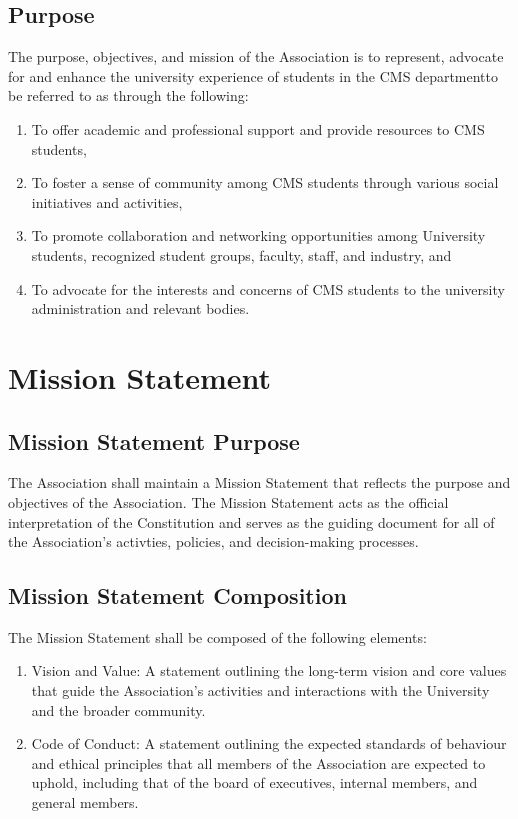 \subsection{Purpose}
The purpose, objectives, and mission of the Association is to 
represent, advocate for and enhance the university experience of 
students in the CMS department\textemdash to be referred to as
\textemdash through the following:

\begin{enumerate}

    \item To offer academic and professional support and provide 
    resources to CMS students,

    \item To foster a sense of community among CMS students 
    through various social initiatives and activities,

    \item To promote collaboration and networking opportunities among 
    University students, recognized student groups, faculty, staff, 
    and industry, and

    \item To advocate for the interests and concerns of CMS students 
    to the university administration and relevant bodies.

\end{enumerate}

\section{Mission Statement}

\subsection{Mission Statement Purpose}
The Association shall maintain a Mission Statement that reflects the 
purpose and objectives of the Association. The Mission Statement
acts as the official interpretation of the Constitution and serves 
as the guiding document for all of the Association's activties, policies,
and decision-making processes.

\subsection{Mission Statement Composition}
The Mission Statement shall be composed of the following elements:
\begin{enumerate}
    \item Vision and Value: A statement outlining the long-term 
    vision and core values that guide the Association's activities
    and interactions with the University and the broader community.

    \item Code of Conduct: A statement outlining the expected 
    standards of behaviour and ethical principles that all members 
    of the Association are expected to uphold, including that of
    the board of executives, internal members, and general members.

\end{enumerate}

